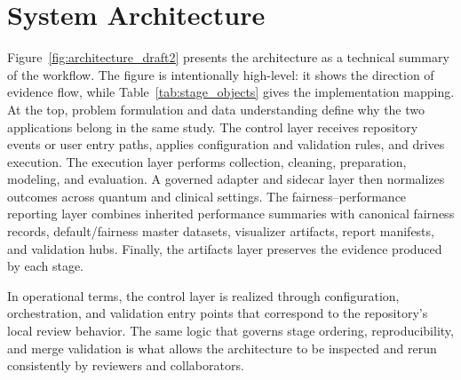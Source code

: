 \documentclass{IEEEtran}
\begin{document}
\section{System Architecture}

Figure~\ref{fig:architecture_draft2} presents the architecture as a technical summary of the workflow. The figure is intentionally high-level: it shows the direction of evidence flow, while Table~\ref{tab:stage_objects} gives the implementation mapping. At the top, problem formulation and data understanding define why the two applications belong in the same study. The control layer receives repository events or user entry paths, applies configuration and validation rules, and drives execution. The execution layer performs collection, cleaning, preparation, modeling, and evaluation. A governed adapter and sidecar layer then normalizes outcomes across quantum and clinical settings. The fairness--performance reporting layer combines inherited performance summaries with canonical fairness records, default/fairness master datasets, visualizer artifacts, report manifests, and validation hubs. Finally, the artifacts layer preserves the evidence produced by each stage.

In operational terms, the control layer is realized through configuration, orchestration, and validation entry points that correspond to the repository's local review behavior. The same logic that governs stage ordering, reproducibility, and merge validation is what allows the architecture to be inspected and rerun consistently by reviewers and collaborators.
\end{document}
